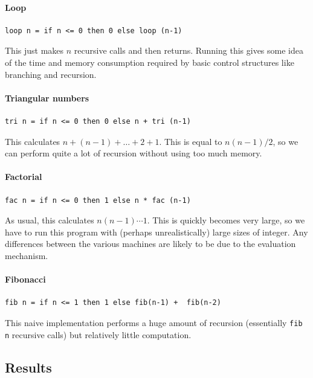 \documentclass[a4paper]{article}
\begin{document}
\paragraph{Loop}
\begin{verbatim}
loop n = if n <= 0 then 0 else loop (n-1)
\end{verbatim}

\noindent This just makes $n$ recursive calls and then returns.
Running this gives some idea of the time and memory consumption
required by basic control structures like branching and recursion.

\paragraph{Triangular numbers}
\begin{verbatim}
tri n = if n <= 0 then 0 else n + tri (n-1)
\end{verbatim}

\noindent This calculates $n + (n-1) + \ldots + 2 + 1$.  This is equal to
$n(n-1)/2$, so we can perform quite a lot of recursion without using too much memory.

\paragraph{Factorial}
\begin{verbatim}
fac n = if n <= 0 then 1 else n * fac (n-1)
\end{verbatim}

\noindent As usual, this calculates $n(n-1)\cdots1$.  This is quickly
becomes very large, so we have to run this program with (perhaps
unrealistically) large sizes of integer.  Any differences between the
various machines are likely to be due to the evaluation mechanism.

\paragraph{Fibonacci}
\begin{verbatim}
fib n = if n <= 1 then 1 else fib(n-1) +  fib(n-2)
\end{verbatim}

\noindent This naive implementation performs a huge amount of
recursion (essentially \texttt{fib n} recursive calls) but relatively
little computation.

\subsection{Results}
\end{document}
